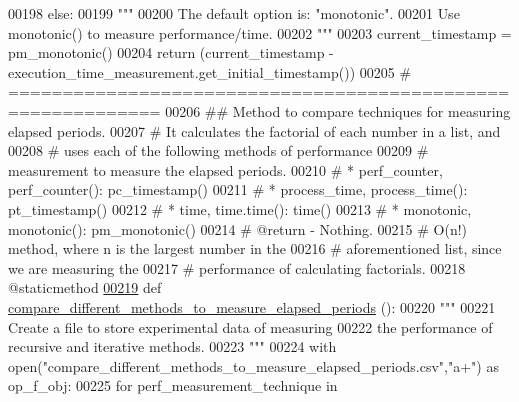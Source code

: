 \begin{DoxyCode}
00198         \textcolor{keywordflow}{else}:
00199             \textcolor{stringliteral}{"""}
00200 \textcolor{stringliteral}{                The default option is: "monotonic".}
00201 \textcolor{stringliteral}{                Use monotonic() to measure performance/time.}
00202 \textcolor{stringliteral}{            """}
00203             current\_timestamp = pm\_monotonic()
00204         \textcolor{keywordflow}{return} (current\_timestamp - execution\_time\_measurement.get\_initial\_timestamp())
00205     \textcolor{comment}{# ============================================================}
00206     \textcolor{comment}{##  Method to compare techniques for measuring elapsed periods.}
00207     \textcolor{comment}{#   It calculates the factorial of each number in a list, and}
00208     \textcolor{comment}{#       uses each of the following methods of performance}
00209     \textcolor{comment}{#       measurement to measure the elapsed periods.}
00210     \textcolor{comment}{#       * perf\_counter, perf\_counter(): pc\_timestamp()}
00211     \textcolor{comment}{#       * process\_time, process\_time(): pt\_timestamp()}
00212     \textcolor{comment}{#       * time, time.time(): time()}
00213     \textcolor{comment}{#       * monotonic, monotonic(): pm\_monotonic()}
00214     \textcolor{comment}{#   @return - Nothing.}
00215     \textcolor{comment}{#   O(n!) method, where n is the largest number in the}
00216     \textcolor{comment}{#       aforementioned list, since we are measuring the}
00217     \textcolor{comment}{#       performance of calculating factorials.}
00218     @staticmethod
\hypertarget{performance__measurement__no__ns_8py_source_l00219}{}\hyperlink{classutilities_1_1timing__measurements_1_1performance__measurement__no__ns_1_1execution__time__measurement_a75eea39203f4d9b779977f9203f6d745}{00219}     \textcolor{keyword}{def }\hyperlink{classutilities_1_1timing__measurements_1_1performance__measurement__no__ns_1_1execution__time__measurement_a75eea39203f4d9b779977f9203f6d745}{compare\_different\_methods\_to\_measure\_elapsed\_periods}
      ():
00220         \textcolor{stringliteral}{"""}
00221 \textcolor{stringliteral}{            Create a file to store experimental data of measuring}
00222 \textcolor{stringliteral}{                the performance of recursive and iterative methods.}
00223 \textcolor{stringliteral}{        """}
00224         with open(\textcolor{stringliteral}{"compare\_different\_methods\_to\_measure\_elapsed\_periods.csv"},\textcolor{stringliteral}{"a+"}) \textcolor{keyword}{as} op\_f\_obj:
00225             \textcolor{keywordflow}{for} perf\_measurement\_technique \textcolor{keywordflow}{in} 

\end{DoxyCode}
